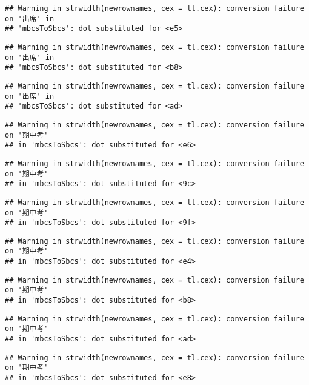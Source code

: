 \documentclass[
]{book}
\begin{document}
\begin{verbatim}
## Warning in strwidth(newrownames, cex = tl.cex): conversion failure on '出席' in
## 'mbcsToSbcs': dot substituted for <e5>
\end{verbatim}

\begin{verbatim}
## Warning in strwidth(newrownames, cex = tl.cex): conversion failure on '出席' in
## 'mbcsToSbcs': dot substituted for <b8>
\end{verbatim}

\begin{verbatim}
## Warning in strwidth(newrownames, cex = tl.cex): conversion failure on '出席' in
## 'mbcsToSbcs': dot substituted for <ad>
\end{verbatim}

\begin{verbatim}
## Warning in strwidth(newrownames, cex = tl.cex): conversion failure on '期中考'
## in 'mbcsToSbcs': dot substituted for <e6>
\end{verbatim}

\begin{verbatim}
## Warning in strwidth(newrownames, cex = tl.cex): conversion failure on '期中考'
## in 'mbcsToSbcs': dot substituted for <9c>
\end{verbatim}

\begin{verbatim}
## Warning in strwidth(newrownames, cex = tl.cex): conversion failure on '期中考'
## in 'mbcsToSbcs': dot substituted for <9f>
\end{verbatim}

\begin{verbatim}
## Warning in strwidth(newrownames, cex = tl.cex): conversion failure on '期中考'
## in 'mbcsToSbcs': dot substituted for <e4>
\end{verbatim}

\begin{verbatim}
## Warning in strwidth(newrownames, cex = tl.cex): conversion failure on '期中考'
## in 'mbcsToSbcs': dot substituted for <b8>
\end{verbatim}

\begin{verbatim}
## Warning in strwidth(newrownames, cex = tl.cex): conversion failure on '期中考'
## in 'mbcsToSbcs': dot substituted for <ad>
\end{verbatim}

\begin{verbatim}
## Warning in strwidth(newrownames, cex = tl.cex): conversion failure on '期中考'
## in 'mbcsToSbcs': dot substituted for <e8>
\end{verbatim}
\end{document}
